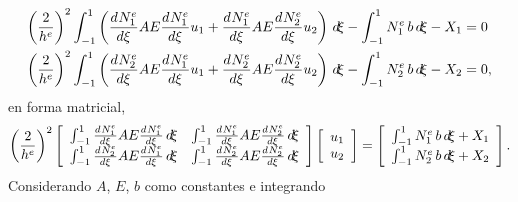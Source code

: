 \documentclass[a4paper,11pt,oneside]{article}
\begin{document}
\begin{align*}
  \left(\frac{2}{h^e}\right)^2 \int_{-1}^{1} \left( \frac{d^{}N_1^e}{d{\xi}^{}} A E \frac{d^{}N_1^e}{d{\xi}^{}}u_1
      + \frac{d^{}N_1^e}{d{\xi}^{}} A E \frac{d^{}N_2^e}{d{\xi}^{}}u_2\right) \,d\!\xi
      - \int_{-1}^{1}N_1^e \,b\,d\!\xi - X_1 &=0 \\ 
  \left(\frac{2}{h^e}\right)^2 \int_{-1}^{1} \left( \frac{d^{}N_2^e}{d{\xi}^{}} A E \frac{d^{}N_1^e}{d{\xi}^{}}u_1
      + \frac{d^{}N_2^e}{d{\xi}^{}} A E \frac{d^{}N_2^e}{d{\xi}^{}}u_2\right) \,d\!\xi
      - \int_{-1}^{1}N_2^e \,b\,d\!\xi - X_2  &=0,
\end{align*}
en forma matricial,
\begin{align*}
  \left(\frac{2}{h^e}\right)^2
  \left[
    \begin{array}{cc}
      \int_{-1}^{1} \frac{d^{}N_1^e}{d{\xi}^{}} A E \frac{d^{}N_1^e}{d{\xi}^{}} \,d\!\xi &
      \int_{-1}^{1} \frac{d^{}N_1^e}{d{\xi}^{}} A E \frac{d^{}N_2^e}{d{\xi}^{}} \,d\!\xi \\
      \int_{-1}^{1} \frac{d^{}N_2^e}{d{\xi}^{}} A E \frac{d^{}N_1^e}{d{\xi}^{}} \,d\!\xi &
      \int_{-1}^{1} \frac{d^{}N_2^e}{d{\xi}^{}} A E \frac{d^{}N_2^e}{d{\xi}^{}} \,d\!\xi
   \end{array}
    \right]
\left[
  \begin{array}{c}
    u_1 \\ u_2
  \end{array}
\right] = 
\left[
  \begin{array}{c}
    \int_{-1}^{1}N_1^e \,b\,d\!\xi + X_1 \\
    \int_{-1}^{1}N_2^e \,b\,d\!\xi + X_2
  \end{array}
\right].
\end{align*}
Considerando $A$, $E$, $b$ como constantes e integrando
\end{document}
